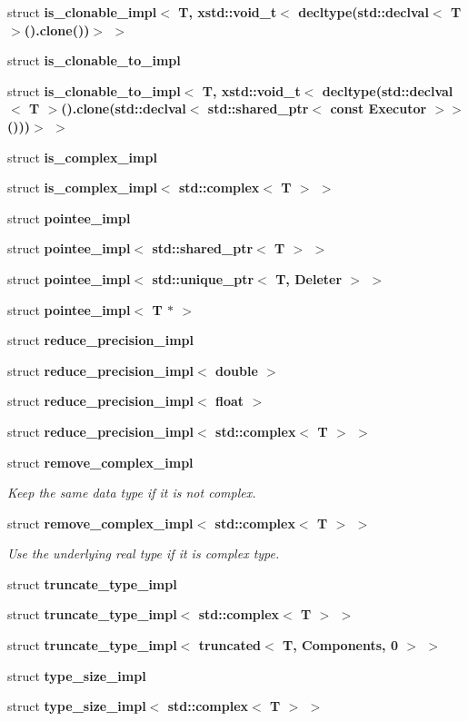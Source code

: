 \begin{DoxyCompactItemize}
struct {\bfseries is\+\_\+clonable\+\_\+impl$<$ T, xstd\+::void\+\_\+t$<$ decltype(std\+::declval$<$ T $>$().\+clone())$>$ $>$}
\item 
struct {\bfseries is\+\_\+clonable\+\_\+to\+\_\+impl}
\item 
struct {\bfseries is\+\_\+clonable\+\_\+to\+\_\+impl$<$ T, xstd\+::void\+\_\+t$<$ decltype(std\+::declval$<$ T $>$().\+clone(std\+::declval$<$ std\+::shared\+\_\+ptr$<$ const Executor $>$$>$()))$>$ $>$}
\item 
struct {\bfseries is\+\_\+complex\+\_\+impl}
\item 
struct {\bfseries is\+\_\+complex\+\_\+impl$<$ std\+::complex$<$ T $>$ $>$}
\item 
struct {\bfseries pointee\+\_\+impl}
\item 
struct {\bfseries pointee\+\_\+impl$<$ std\+::shared\+\_\+ptr$<$ T $>$ $>$}
\item 
struct {\bfseries pointee\+\_\+impl$<$ std\+::unique\+\_\+ptr$<$ T, Deleter $>$ $>$}
\item 
struct {\bfseries pointee\+\_\+impl$<$ T $\ast$ $>$}
\item 
struct {\bfseries reduce\+\_\+precision\+\_\+impl}
\item 
struct {\bfseries reduce\+\_\+precision\+\_\+impl$<$ double $>$}
\item 
struct {\bfseries reduce\+\_\+precision\+\_\+impl$<$ float $>$}
\item 
struct {\bfseries reduce\+\_\+precision\+\_\+impl$<$ std\+::complex$<$ T $>$ $>$}
\item 
struct {\bfseries remove\+\_\+complex\+\_\+impl}
\begin{DoxyCompactList}\small\item\em Keep the same data type if it is not complex. \end{DoxyCompactList}\item 
struct {\bfseries remove\+\_\+complex\+\_\+impl$<$ std\+::complex$<$ T $>$ $>$}
\begin{DoxyCompactList}\small\item\em Use the underlying real type if it is complex type. \end{DoxyCompactList}\item 
struct {\bfseries truncate\+\_\+type\+\_\+impl}
\item 
struct {\bfseries truncate\+\_\+type\+\_\+impl$<$ std\+::complex$<$ T $>$ $>$}
\item 
struct {\bfseries truncate\+\_\+type\+\_\+impl$<$ truncated$<$ T, Components, 0 $>$ $>$}
\item 
struct {\bfseries type\+\_\+size\+\_\+impl}
\item 
struct {\bfseries type\+\_\+size\+\_\+impl$<$ std\+::complex$<$ T $>$ $>$}
\end{DoxyCompactItemize}
